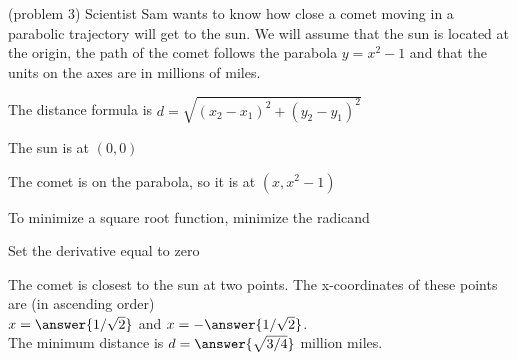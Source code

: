 \documentclass{ximera}
\begin{document}
\begin{problem}(problem 3)
Scientist Sam wants to know how close a comet moving in a parabolic trajectory will get to the sun. 
We will assume that the sun is located at the origin, 
the path of the comet follows the parabola $y = x^2 - 1$ and that the units 
on the axes are in millions of miles.



\begin{hint}
The distance formula is $d = \sqrt{(x_2 - x_1)^2 + (y_2 - y_1)^2}$
\end{hint}
\begin{hint}
The sun is at $(0,0)$
\end{hint}
\begin{hint}
The comet is on the parabola, so it is at $(x, x^2 - 1)$
\end{hint}
\begin{hint}
To minimize a square root function, minimize the radicand
\end{hint}
\begin{hint}
Set the derivative equal to zero
\end{hint}

The comet is closest to the sun at two points.
 The x-coordinates of these points are (in ascending order)\\
$x =  \answer{1/\sqrt2}$ and $x = - \answer{1/\sqrt2}$.\\
The minimum distance is $d = \answer{\sqrt{3/4}}$ million miles.
\end{problem}
\end{document}
